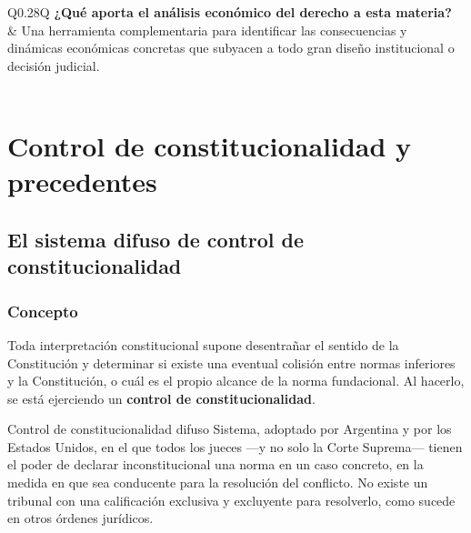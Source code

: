 \documentclass[12pt,oneside]{book}
\begin{document}
\begin{longtable}{Q{0.28\textwidth}Q{\textwidth\relax}}
\textbf{¿Qué aporta el análisis económico del derecho a esta materia?} &
Una herramienta complementaria para identificar las consecuencias y dinámicas económicas concretas que subyacen a todo gran diseño institucional o decisión judicial.
\\
\midrule
{} \\
\end{longtable}

\part{Control de constitucionalidad y precedentes}

\chapter{El sistema difuso de control de constitucionalidad}

\section{Concepto}

Toda interpretación constitucional supone desentrañar el sentido de la Constitución y determinar si existe una eventual colisión entre normas inferiores y la Constitución, o cuál es el propio alcance de la norma fundacional. Al hacerlo, se está ejerciendo un \textbf{control de constitucionalidad}.

\begin{definition}{Control de constitucionalidad difuso}
Sistema, adoptado por Argentina y por los Estados Unidos, en el que todos los jueces ---y no solo la Corte Suprema--- tienen el poder de declarar inconstitucional una norma en un caso concreto, en la medida en que sea conducente para la resolución del conflicto. No existe un tribunal con una calificación exclusiva y excluyente para resolverlo, como sucede en otros órdenes jurídicos.
\end{definition}
\end{document}
